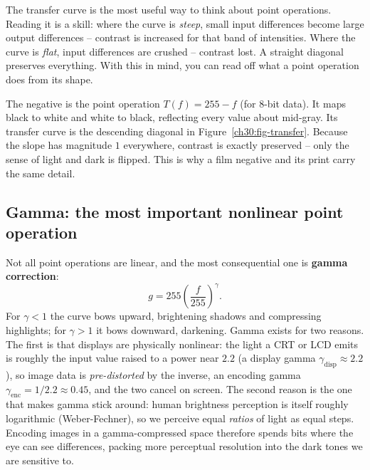 The transfer curve is the most useful way to think about point operations.
Reading it is a skill: where the curve is \emph{steep}, small input differences
become large output differences -- contrast is increased for that band of
intensities. Where the curve is \emph{flat}, input differences are crushed --
contrast lost. A straight diagonal preserves everything. With this in mind, you can
read off what a point operation does from its shape.

\begin{example}
\label{ch30:ex-negative}
The negative is the point operation $T(f)=255-f$ (for 8-bit data). It maps black
to white and white to black, reflecting every value about mid-gray. Its transfer
curve is the descending diagonal in Figure~\ref{ch30:fig-transfer}. Because the
slope has magnitude $1$ everywhere, contrast is exactly preserved -- only the
sense of light and dark is flipped. This is why a film negative and its print
carry the same detail.
\end{example}

\subsection{Gamma: the most important nonlinear point operation}
\label{ch30:gamma}

Not all point operations are linear, and the most consequential one is
\textbf{gamma correction}:
\begin{equation}
\label{ch30:gamma-eq}
g = 255\left(\frac{f}{255}\right)^{\gamma}.
\end{equation}
For $\gamma<1$ the curve bows upward, brightening shadows and compressing
highlights; for $\gamma>1$ it bows downward, darkening. Gamma exists for two
reasons. The first is that displays are physically nonlinear: the light a CRT or
LCD emits is roughly the input value raised to a power near $2.2$ (a display
gamma $\gamma_{\text{disp}}\approx 2.2$), so image data is \emph{pre-distorted} by
the inverse, an encoding gamma $\gamma_{\text{enc}} = 1/2.2\approx 0.45$, and the
two cancel on screen. The second reason is the one
that makes gamma stick around: human brightness perception is itself roughly
logarithmic (Weber-Fechner), so we perceive equal \emph{ratios} of light as equal
steps. Encoding
images in a gamma-compressed space therefore spends bits where the eye can see
differences, packing more perceptual resolution into the dark tones we are
sensitive to.

